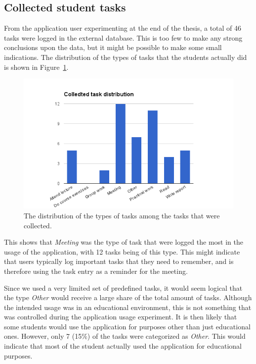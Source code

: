 \subsection{Collected student tasks}
\label{subsec:collectedtasks}

From the application user experimenting at the end of the thesis, a total of 46 tasks were logged in the external database. This is too few to make any strong conclusions upon the data, but it might be possible to make some small indications. The distribution of the types of tasks that the students actually did is shown in Figure~\ref{fig:taskdistribution}.
\begin{figure}[tbp]
  \centering
  \includegraphics[width=\textwidth]{figures/TaskDistribution.png}
  \caption[Collected task type distribution]{The distribution of the types of tasks among the tasks that were collected.}
  \label{fig:taskdistribution}
\end{figure}
This shows that \emph{Meeting} was the type of task that were logged the most in the usage of the application, with 12 tasks being of this type. This might indicate that users typically log important tasks that they need to remember, and is therefore using the task entry as a reminder for the meeting.

Since we used a very limited set of predefined tasks, it would seem logical that the type \emph{Other} would receive a large share of the total amount of tasks. Although the intended usage was in an educational environment, this is not something that was controlled during the application usage experiment. It is then likely that some students would use the application for purposes other than just educational ones. However, only 7 (15\%) of the tasks were categorized as \emph{Other}. This would indicate that most of the student actually used the application for educational purposes.

